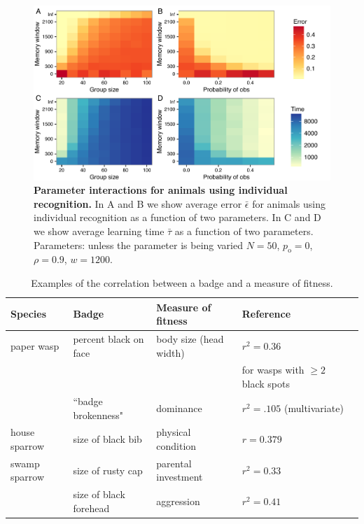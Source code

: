 \begin{figure}[ht]
\includegraphics[width=.8\textwidth]{figures/parameter_interactions_indiv.pdf}
\caption{\sffamily\small\textbf{Parameter interactions for animals using individual recognition.}
In A and B we show average error $\bar{\epsilon}$ for animals using individual recognition as a function of two parameters. In C and D we show average learning time $\bar{\tau}$ as a function of two parameters. Parameters: unless the parameter is being varied $N=50$, $p_\text{o}=0$, $\rho=0.9$, $w=1200$.}
\label{interactions_indiv}
\end{figure}

\begin{table}
\caption{\label{corr_examples} Examples of the correlation between a badge and a measure of fitness.}
\begin{tabular}{lllll}
Species & Badge & Measure of fitness & Reference
\\\hline paper wasp & percent black on face & body size (head width) & $r^2=0.36$  & \cite{Tibbetts:2004kx}
\\ & & & for wasps with $\geq 2$ black spots
\\ & ``badge brokenness" & dominance & $r^2=.105$ (multivariate) & \cite{Tibbetts:2004kx}
\\ \hline house sparrow & size of black bib & physical condition & $r=0.379$ & \cite{Veiga:1993fk}
\\ \hline swamp sparrow & size of rusty cap & parental investment & $r^2=0.33$ & \cite{Olsen:2010uq}
\\ & size of black forehead & aggression & $r^2=0.41$ & \cite{Olsen:2010uq}
\end{tabular}
\end{table}


